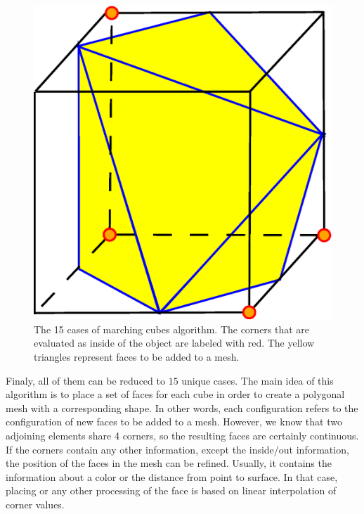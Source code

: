 \begin{figure}[!htbp]
\hspace{3mm}
\includegraphics[scale=0.15]{../img/mar_cub_case14.eps}

\caption{The 15 cases of marching cubes algorithm. The corners that are evaluated as inside of the object
are labeled with red. The yellow triangles represent faces to be added to a mesh.}
\label{fig:mc_cases}
\end{figure}
Finaly, all of them can be reduced to $15$ unique cases. The main idea of this algorithm is to
place a set of faces for each cube in order to create a polygonal mesh with a corresponding shape.
In other words, each configuration refers to the configuration of new faces to be added to a mesh.
However, we know that two adjoining elements share 4 corners, so the resulting faces are certainly
continuous.
If the corners contain any other information, except the inside/out information, the position of 
the faces in the mesh can be refined. Usually, it contains the information about a color or
the distance from point to surface. In that case, placing or any other processing of
the face is based on linear interpolation of corner values.\\
\\

